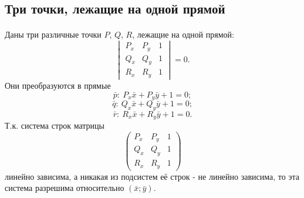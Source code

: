\subsection{Три точки, лежащие на одной прямой}
\paragraph{}Даны три различные точки $P$, $Q$, $R$, лежащие на одной прямой:
$$\begin{vmatrix}
	P_x & P_y & 1 \\
	Q_x & Q_y & 1 \\
	R_x & R_y & 1
\end{vmatrix}
= 0.$$
Они преобразуются в прямые
$$\bar{p}:\: P_x \bar{x} + P_y \bar{y} + 1 = 0;$$
$$\bar{q}:\: Q_x \bar{x} + Q_y \bar{y} + 1 = 0;$$
$$\bar{r}:\: R_x \bar{x} + R_y \bar{y} + 1 = 0.$$
Т.к. система строк матрицы
$$\begin{pmatrix}
	P_x & P_y & 1 \\
	Q_x & Q_y & 1 \\
	R_x & R_y & 1
\end{pmatrix}$$
линейно зависима, а никакая из подсистем её строк - не линейно зависима, то эта система разрешима относительно $(\bar{x}; \bar{y})$.
